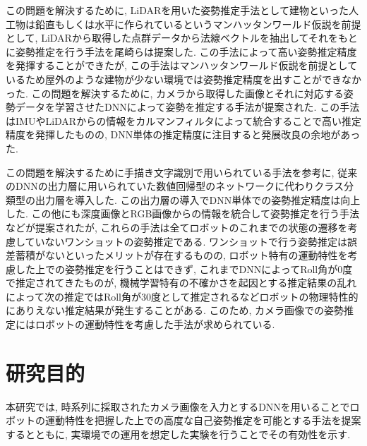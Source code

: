 この問題を解決するために, LiDARを用いた姿勢推定手法として建物といった人工物は鉛直もしくは水平に作られているというマンハッタンワールド仮説\cite{マンハッタンワールド仮説}を前提として, LiDARから取得した点群データから法線ベクトルを抽出してそれをもとに姿勢推定を行う手法を尾崎らは提案した\cite{ozaki_lidar_normal}. この手法によって高い姿勢推定精度を発揮することができたが, この手法はマンハッタンワールド仮説を前提としているため屋外のような建物が少ない環境では姿勢推定精度を出すことができなかった. この問題を解決するために, カメラから取得した画像とそれに対応する姿勢データを学習させたDNNによって姿勢を推定する手法が提案された\cite{Ozaki_SII2021}\cite{gravity_vector_estimation}. この手法はIMUやLiDARからの情報をカルマンフィルタ\cite{EKF_paper}によって統合することで高い推定精度を発揮したものの\cite{Ozaki_springer_Camera_and_IMU_EKF}\cite{Ozaki_IEEE_Camera_and_IMU_EKF}\cite{Ozaki_springer_Camera_and_LiDAR_DNN}, DNN単体の推定精度に注目すると発展改良の余地があった. \par この問題を解決するために手描き文字識別で用いられている手法を参考に, 従来のDNNの出力層に用いられていた数値回帰型のネットワーク\cite{Ozaki_SII2021}に代わりクラス分類型の出力層を導入した\cite{Kawai_SII2022}. この出力層の導入でDNN単体での姿勢推定精度は向上した. この他にも深度画像とRGB画像からの情報を統合して姿勢推定を行う手法\cite{Kawai_SII2023}などが提案されたが, これらの手法は全てロボットのこれまでの状態の遷移を考慮していないワンショットの姿勢推定である. ワンショットで行う姿勢推定は誤差蓄積がないといったメリットが存在するものの, ロボット特有の運動特性を考慮した上での姿勢推定を行うことはできず, これまでDNNによってRoll角が0度で推定されてきたものが, 機械学習特有の不確かさ\cite{Uncertain_in_DL}を起因とする推定結果の乱れによって次の推定ではRoll角が30度として推定されるなどロボットの物理特性的にありえない推定結果が発生することがある. このため, カメラ画像での姿勢推定にはロボットの運動特性を考慮した手法が求められている.

\section{研究目的}
本研究では, 時系列に採取されたカメラ画像を入力とするDNNを用いることでロボットの運動特性を把握した上での高度な自己姿勢推定を可能とする手法を提案するとともに, 実環境での運用を想定した実験を行うことでその有効性を示す.